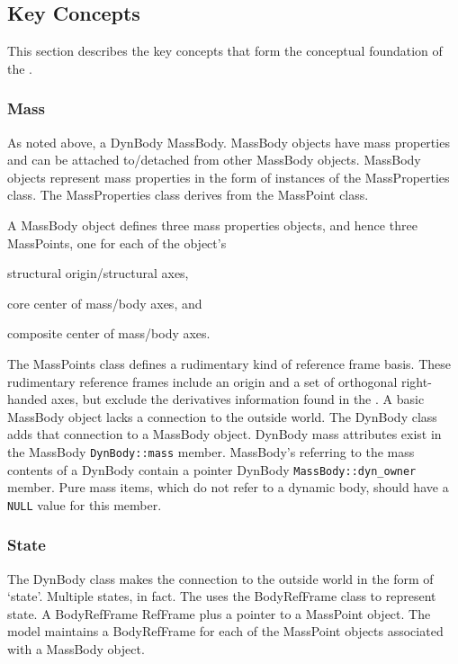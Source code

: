 \subsection{Key Concepts}\label{sec:key_concepts}
This section describes the key concepts that form the conceptual foundation of
the \ModelDesc.

\subsubsection{Mass}\label{sec:key_mass}
As noted above, a DynBody \hasa MassBody.
MassBody objects have mass properties and can be attached to/detached from
other MassBody objects. MassBody objects represent mass properties in the
form of instances of the MassProperties class.
The MassProperties class derives from the MassPoint class.

A MassBody object defines three mass properties objects, and hence three
MassPoints, one for each of the object's \begin{inparaenum}[(1)]
\item structural origin/structural axes,
\item core center of mass/body axes, and
\item composite center of mass/body axes.
\end{inparaenum}
The MassPoints class defines a rudimentary kind of reference frame basis. These
rudimentary reference frames include an origin and a set of orthogonal
right-handed axes, but exclude the derivatives information found in the
.
A basic MassBody object lacks a connection to the
outside world. The DynBody class adds that connection to a MassBody object. 
DynBody mass attributes exist in the MassBody \verb+DynBody::mass+  member.
MassBody's referring to the mass contents of a DynBody contain a pointer DynBody \verb+MassBody::dyn_owner+ member. 
Pure mass items, which do not refer to a dynamic body, should have a \verb+NULL+ value for this member.

\subsubsection{State}
The DynBody class makes the connection to the outside world in the form of
`state'.  Multiple states, in fact. The \ModelDesc uses the BodyRefFrame
class to represent state. A BodyRefFrame \isa RefFrame plus a pointer
to a MassPoint object. The model maintains a BodyRefFrame for each of the
MassPoint objects associated with a MassBody object.

